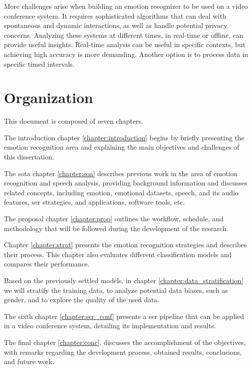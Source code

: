 More challenges arise when building an emotion recognizer to be used on a video conference system. It requires sophisticated algorithms that can deal with spontaneous and dynamic interactions, as well as handle potential privacy concerns. Analyzing these systems at different times, in real-time or offline, can provide useful insights. Real-time analysis can be useful in specific contexts, but achieving high accuracy is more demanding. Another option is to process data in specific timed intervals.

\section{Organization}

This document is composed of seven chapters.

The introduction chapter \ref{chapter:introduction} begins by briefly presenting the emotion recognition area and explaining the main objectives and challenges of this dissertation.

The \ac{sota} chapter \ref{chapter:soa} describes previous work in the area of emotion recognition and speech analysis, providing background information and discusses related concepts, including emotion, emotional datasets, speech, and its audio features, \ac{ser} strategies, and applications, software tools, etc.

The proposal chapter \ref{chapter:prop} outlines the workflow, schedule, and methodology that will be followed during the development of the research.

Chapter \ref{chapter:strat} presents the emotion recognition strategies and describes their process. This chapter also evaluates different classification models and compares their performance.

Based on the previously settled models, in chapter \ref{chapter:data_stratification} we will stratify the training data, to analyze potential data biases, such as gender, and to explore the quality of the used data.

The sixth chapter \ref{chapter:ser_conf} presents a \ac{ser} pipeline that can be applied in a video conference system, detailing its implementation and results.

The final chapter \ref{chapter:conc}, discusses the accomplishment of the objectives, with remarks regarding the development process, obtained results, conclusions, and future work.